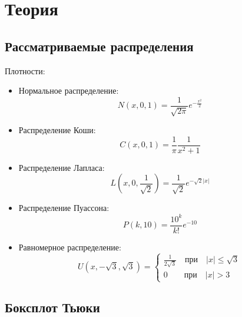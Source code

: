 \documentclass[12pt,a4paper]{article}
\begin{document}
	\newpage
	
	\section{Теория}
		\subsection{Рассматриваемые распределения}
			Плотности:
			\begin{itemize}
				\item Нормальное распределение:
				\begin{equation}\label{norm}
					\textit{N}(\textit{x}, 0, 1)=\frac{1}{\sqrt{2\pi}}e^{-\frac{x^2}{2}}
				\end{equation}
				
				\item Распределение Коши:
				\begin{equation}\label{cauchy}
					\textit{C}(\textit{x}, 0, 1)=\frac{1}{\pi}\frac{1}{x^2+1}
				\end{equation}
				
				\item Распределение Лапласа:
				\begin{equation}\label{laplace}
					\textit{L}(\textit{x}, 0, \frac{1}{\sqrt{2}})=\frac{1}{\sqrt{2}}e^{-\sqrt{2}|x|}
				\end{equation}
				
				\item Распределение Пуассона:
				\begin{equation}\label{poisson}
					\textit{P}(\textit{k}, 10)=\frac{10^k}{k!}e^{-10}
				\end{equation}
				
				\item Равномерное распределение:
				\begin{equation}\label{uniform}
					\textit{U}(\textit{x}, -\sqrt{3}, \sqrt{3})=
					\left\{
					\begin{array}{l}
						\frac{1}{2\sqrt{3}} \quad \text{при} \quad |x|\leq \sqrt{3}\\
						0 \quad \quad \text{при} \quad |x|>3
					\end{array}
					\right.
				\end{equation}
			\end{itemize}
		
		\subsection{Боксплот Тьюки}
\end{document}

